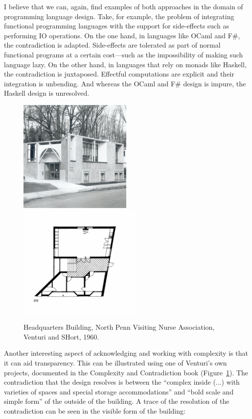 I believe that we can, again, find examples of both approaches in the domain of programming
language design. Take, for example, the problem of integrating functional programming languages
with the support for side-effects such as performing IO operations. On the one hand, in languages
like OCaml and F\#, the contradiction is adapted. Side-effects are tolerated as part of normal
functional programs at a certain cost---such as the impossibility of making such language lazy.
On the other hand, in languages that rely on monads like Haskell, the contradiction is juxtaposed.
Effectful computations are explicit and their integration is unbending. And whereas the OCaml and
F\# design is impure, the Haskell design is unresolved.

\begin{figure}
\centering
\includegraphics[height=15em]{fig/nursehq.jpg}\quad
\includegraphics[height=15em]{fig/nursehq-floor.png}
\caption{Headquarters Building, North Penn Visiting Nurse Association, Venturi and SHort, 1960.}
\label{fig:nursehq}
\end{figure}

Another interesting aspect of acknowledging and working with complexity is that it can aid
transparency. This can be illustrated using one of Venturi's own projects, documented in the
Complexity and Contradiction book (Figure~\ref{fig:nursehq}). The contradiction that the design
resolves is between the ``complex inside (...) with varieties of spaces and special storage
accommodations'' and ``bold scale and simple form'' of the outside of the building. A trace of
the resolution of the contradiction can be seen in the visible form of the building:

